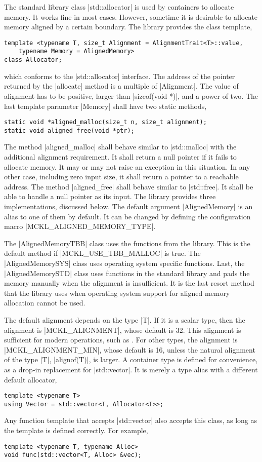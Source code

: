 The standard library class |std::allocator| is used by containers to allocate
memory. It works fine in most cases. However, sometime it is desirable to
allocate memory aligned by a certain boundary. The library provides the class
template,
\begin{verbatim}
template <typename T, size_t Alignment = AlignmentTrait<T>::value,
    typename Memory = AlignedMemory>
class Allocator;
\end{verbatim}
which conforms to the |std::allocator| interface. The address of the pointer
returned by the |allocate| method is a multiple of |Alignment|. The value of
alignment has to be positive, larger than |sizeof(void *)|, and a power of two.
The last template parameter |Memory| shall have two static methods,
\begin{verbatim}
static void *aligned_malloc(size_t n, size_t alignment);
static void aligned_free(void *ptr);
\end{verbatim}
The method |aligned_malloc| shall behave similar to |std::malloc| with the
additional alignment requirement. It shall return a null pointer if it fails to
allocate memory. It may or may not raise an exception in this situation. In any
other case, including zero input size, it shall return a pointer to a reachable
address. The method |aligned_free| shall behave similar to |std::free|. It
shall be able to handle a null pointer as its input. The library provides three
implementations, discussed below. The default argument |AlignedMemory| is an
alias to one of them by default. It can be changed by defining the
configuration macro |MCKL_ALIGNED_MEMORY_TYPE|.

The |AlignedMemoryTBB| class uses the functions from the \tbb library. This is
the default method if |MCKL_USE_TBB_MALLOC| is true. The |AlignedMemorySYS|
class uses operating system specific functions. Last, the |AlignedMemorySTD|
class uses functions in the standard library and pads the memory manually when
the alignment is insufficient. It is the last resort method that the library
uses when operating system support for aligned memory allocation cannot be
used.

The default alignment depends on the type |T|. If it is a scalar type, then the
alignment is |MCKL_ALIGNMENT|, whose default is 32. This alignment is
sufficient for modern \simd operations, such as \avx. For other types, the
alignment is |MCKL_ALIGNMENT_MIN|, whose default is 16, unless the natural
alignment of the type |T|, |alignof(T)|, is larger. A container type is
defined for convenience, as a drop-in replacement for |std::vector|. It is
merely a type alias with a different default allocator,
\begin{verbatim}
template <typename T>
using Vector = std::vector<T, Allocator<T>>;
\end{verbatim}
Any function template that accepts |std::vector| also accepts this class, as
long as the template is defined correctly. For example,
\begin{verbatim}
template <typename T, typename Alloc>
void func(std::vector<T, Alloc> &vec);
\end{verbatim}

